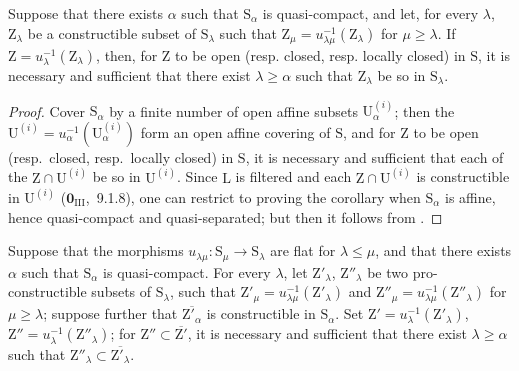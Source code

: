 \begin{corollary}[8.3.12]
\label{IV.8.3.12}
Suppose that there exists $\alpha$ such that $\mathrm{S}_\alpha$ is quasi-compact, and let, for every $\lambda$, $\mathrm{Z}_\lambda$ be a constructible subset of $\mathrm{S}_\lambda$ such that $\mathrm{Z}_\mu=u_{\lambda\mu}^{-1}(\mathrm{Z}_\lambda)$ for $\mu\geqslant\lambda$.
If $\mathrm{Z}=u_\lambda^{-1}(\mathrm{Z}_\lambda)$,
then, for $\mathrm{Z}$ to be open \textup{(resp.} closed, \textup{resp.} locally closed) in $\mathrm{S}$, it is necessary and sufficient that there exist $\lambda\geqslant\alpha$ such that $\mathrm{Z}_\lambda$ be so in $\mathrm{S}_\lambda$.
\end{corollary}

\begin{proof}
Cover $\mathrm{S}_\alpha$ by a finite number of open affine subsets $\mathrm{U}_\alpha^{(i)}$; then the $\mathrm{U}^{(i)}=u_\alpha^{-1}(\mathrm{U}_\alpha^{(i)})$ form an open affine covering of $\mathrm{S}$, and for $\mathrm{Z}$ to be open (resp.\ closed, resp.\ locally closed) in $\mathrm{S}$, it is necessary and sufficient that each of the $\mathrm{Z}\cap\mathrm{U}^{(i)}$ be so in $\mathrm{U}^{(i)}$.
Since $\mathrm{L}$ is filtered and each $\mathrm{Z}\cap\mathrm{U}^{(i)}$ is constructible in $\mathrm{U}^{(i)}$ ($\mathbf{0}_{\mathrm{III}}$,~9.1.8), one can restrict to proving the corollary when $\mathrm{S}_\alpha$ is affine, hence quasi-compact and quasi-separated; but then it follows from .
\end{proof}

\begin{proposition}[8.3.13]
\label{IV.8.3.13}
Suppose that the morphisms $u_{\lambda\mu}:\mathrm{S}_\mu\to\mathrm{S}_\lambda$ are flat for $\lambda\leqslant\mu$, and that there exists $\alpha$ such that $\mathrm{S}_\alpha$ is quasi-compact.
For every $\lambda$, let $\mathrm{Z}'_\lambda$, $\mathrm{Z}''_\lambda$ be two pro-constructible subsets of $\mathrm{S}_\lambda$, such that $\mathrm{Z}'_\mu=u_{\lambda\mu}^{-1}(\mathrm{Z}'_\lambda)$ and $\mathrm{Z}''_\mu=u_{\lambda\mu}^{-1}(\mathrm{Z}''_\lambda)$ for $\mu\geqslant\lambda$; suppose further that $\overline{\mathrm{Z}'_\alpha}$ is constructible in $\mathrm{S}_\alpha$.
Set $\mathrm{Z}'=u_\lambda^{-1}(\mathrm{Z}'_\lambda)$, $\mathrm{Z}''=u_\lambda^{-1}(\mathrm{Z}''_\lambda)$; for $\mathrm{Z}''\subset\overline{\mathrm{Z}'}$, it is necessary and sufficient that there exist $\lambda\geqslant\alpha$ such that $\mathrm{Z}''_\lambda\subset\overline{\mathrm{Z}'_\lambda}$.
\end{proposition}


